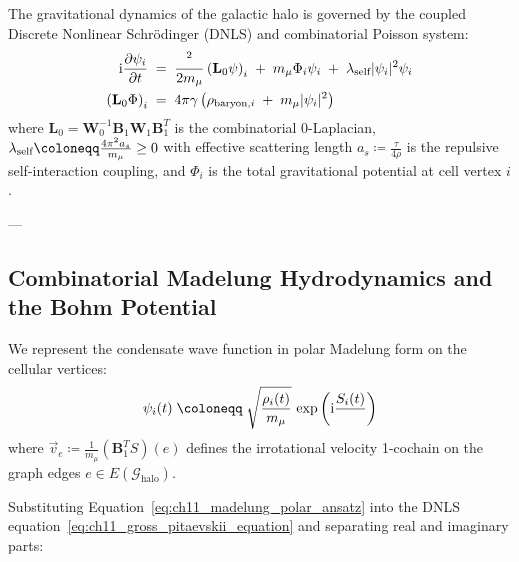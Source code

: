 \documentclass[
    12pt,
    a4paper,
    headings=normal,
    twoside=false,
    open=any,
    parskip=half
]{scrbook}
\let\hbar\relax
\newcommand{\iu}{\mathrm{i}}
\begin{document}
\begin{phystheorem}\label{thm:ch11_gpp_system_master}
The gravitational dynamics of the galactic halo is governed by the coupled Discrete Nonlinear Schrödinger (DNLS) and combinatorial Poisson system:
\begin{align}
\iu\hbar \frac{\partial \psi_i}{\partial t} &\;=\; \frac{\hbar^2}{2m_\mu} \left( \mathbf{L}_0 \psi \right)_i \;+\; m_\mu \Phi_i \psi_i \;+\; \lambda_{\text{self}} |\psi_i|^2 \psi_i \label{eq:ch11_gross_pitaevskii_equation} \\
\left( \mathbf{L}_0 \Phi \right)_i &\;=\; 4\pi\gamma \left( \rho_{\text{baryon}, i} \;+\; m_\mu |\psi_i|^2 \right) \label{eq:ch11_poisson_equation}
\end{align}
where $\mathbf{L}_0 = \mathbf{W}_0^{-1} \mathbf{B}_1 \mathbf{W}_1 \mathbf{B}_1^T$ is the combinatorial 0-Laplacian, $\lambda_{\text{self}} \coloneqq \frac{4\pi\hbar^2 a_s}{m_\mu} \ge 0$ with effective scattering length $a_s \coloneqq \frac{\tau}{4\rho}$ is the repulsive self-interaction coupling, and $\Phi_i$ is the total gravitational potential at cell vertex $i$.
\end{phystheorem}

---

\subsection{Combinatorial Madelung Hydrodynamics and the Bohm Potential}

We represent the condensate wave function in polar Madelung form on the cellular vertices:
\begin{equation}
\psi_i(t) \;\coloneqq\; \sqrt{\frac{\rho_i(t)}{m_\mu}} \, \exp\left( \iu \frac{S_i(t)}{\hbar} \right)
\label{eq:ch11_madelung_polar_ansatz}
\end{equation}
where $\vec{v}_e \coloneqq \frac{1}{m_\mu} (\mathbf{B}_1^T S)(e)$ defines the irrotational velocity 1-cochain on the graph edges $e \in E(\mathcal{G}_{\text{halo}})$.

Substituting Equation~\eqref{eq:ch11_madelung_polar_ansatz} into the DNLS equation~\eqref{eq:ch11_gross_pitaevskii_equation} and separating real and imaginary parts:
\end{document}

